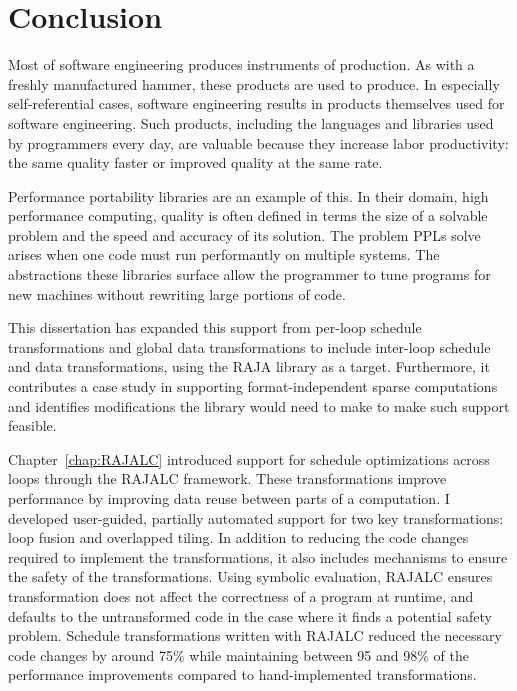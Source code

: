 \chapter{Conclusion}\label{chap:Conclusion}

Most of software engineering produces instruments of production.
As with a freshly manufactured hammer, these products are used to produce.
In especially self-referential cases, software engineering results in products themselves used for software engineering.
Such products, including the languages and libraries used by programmers every day, are valuable because they increase labor productivity: the same quality faster or improved quality at the same rate.

Performance portability libraries are an example of this.
In their domain, high performance computing, quality is often defined in terms the size of a solvable problem and the speed and accuracy of its solution.
The problem PPLs solve arises when one code must run performantly on multiple systems. 
The abstractions these libraries surface allow the programmer to tune programs for new machines without rewriting large portions of code.

This dissertation has expanded this support from per-loop schedule transformations and global data transformations to include inter-loop schedule and data transformations, using the RAJA library as a target.
Furthermore, it contributes a case study in supporting format-independent sparse computations and identifies modifications the library would need to make to make such support feasible.

Chapter~\ref{chap:RAJALC} introduced support for schedule optimizations across loops through the RAJALC framework.
These transformations improve performance by improving data reuse between parts of a computation.
I developed user-guided, partially automated support for two key transformations: loop fusion and overlapped tiling.
In addition to reducing the code changes required to implement the transformations, it also includes mechanisms to ensure the safety of the transformations.
Using symbolic evaluation, RAJALC ensures transformation does not affect the correctness of a program at runtime, and defaults to the untransformed code in the case where it finds a potential safety problem.
Schedule transformations written with RAJALC reduced the necessary code changes by around 75\% while maintaining between 95 and 98\% of the performance improvements compared to hand-implemented transformations.

